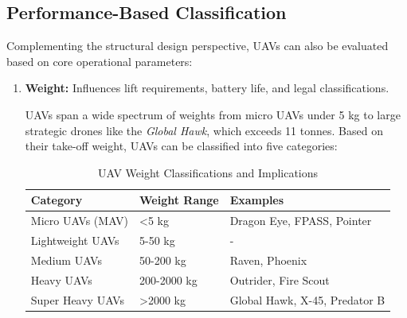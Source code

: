 

\subsection{Performance-Based Classification}

Complementing the structural design perspective, UAVs can also be evaluated based on core operational parameters:

\begin{enumerate}
    \item \textbf{Weight:} Influences lift requirements, battery life, and legal classifications.

    UAVs span a wide spectrum of weights from micro UAVs under 5 kg to large strategic drones like the \textit{Global Hawk}, which exceeds 11 tonnes. Based on their take-off weight, UAVs can be classified into five categories:


    \begin{table}[h]
        \centering
        \label{tab:uav_weights}
        \begin{tabular}{|l|l|l|}
        \hline
        \textbf{Category} & \textbf{Weight Range} & \textbf{Examples} \\ \hline
        Micro UAVs (MAV) & <5 kg & Dragon Eye, FPASS, Pointer \\ \hline
        Lightweight UAVs & 5-50 kg & - \\ \hline
        Medium UAVs & 50-200 kg & Raven, Phoenix \\ \hline
        Heavy UAVs & 200-2000 kg & Outrider, Fire Scout \\ \hline
        Super Heavy UAVs & >2000 kg & Global Hawk, X-45, Predator B \\ \hline
        \end{tabular}
        \caption{UAV Weight Classifications and Implications}
    \end{table}


\end{enumerate}
